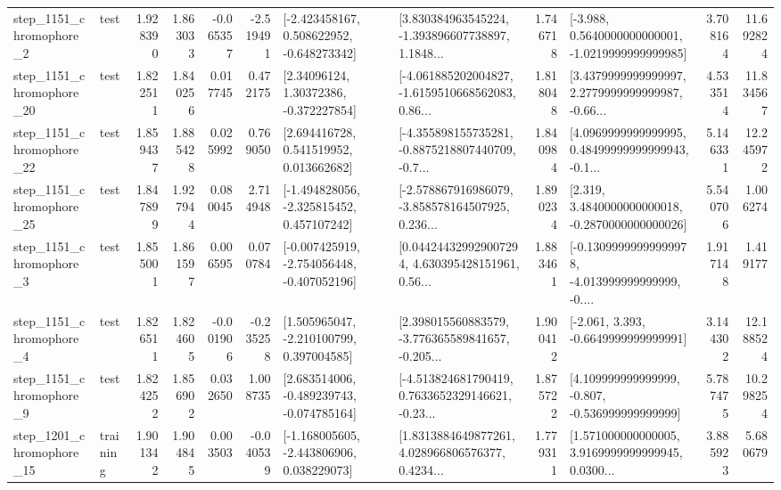 \begin{tabular}{llrrrrllrlrr}
  step\_1151\_chromophore\_2 &      test &      1.928390 &    1.863033 &     -0.065357 & -2.519491 &   [-2.423458167, 0.508622952, -0.648273342] &  [3.830384963545224, -1.393896607738897, 1.1848... &       1.746718 &  [-3.988, 0.5640000000000001, -1.0219999999999985] &            3.708164 &         11.692824 \\
 step\_1151\_chromophore\_20 &      test &      1.822511 &    1.840256 &      0.017745 &  0.472175 &      [2.34096124, 1.30372386, -0.372227854] &  [-4.061885202004827, -1.6159510668562083, 0.86... &       1.818048 &  [3.4379999999999997, 2.2779999999999987, -0.66... &            4.533514 &         11.834567 \\
 step\_1151\_chromophore\_22 &      test &      1.859437 &    1.885428 &      0.025992 &  0.769050 &     [2.694416728, 0.541519952, 0.013662682] &  [-4.355898155735281, -0.8875218807440709, -0.7... &       1.840984 &  [4.0969999999999995, 0.48499999999999943, -0.1... &            5.146331 &         12.245972 \\
 step\_1151\_chromophore\_25 &      test &      1.847899 &    1.927944 &      0.080045 &  2.714948 &   [-1.494828056, -2.325815452, 0.457107242] &  [-2.578867916986079, -3.858578164507925, 0.236... &       1.890234 &   [2.319, 3.4840000000000018, -0.2870000000000026] &            5.540706 &          1.006274 \\
  step\_1151\_chromophore\_3 &      test &      1.855001 &    1.861597 &      0.006595 &  0.070784 &  [-0.007425919, -2.754056448, -0.407052196] &  [0.044244329929007294, 4.630395428151961, 0.56... &       1.883461 &  [-0.13099999999999978, -4.013999999999999, -0.... &            1.917148 &          1.419177 \\
  step\_1151\_chromophore\_4 &      test &      1.826511 &    1.824605 &     -0.001906 & -0.235258 &    [1.505965047, -2.210100799, 0.397004585] &  [2.398015560883579, -3.776365589841657, -0.205... &       1.900412 &               [-2.061, 3.393, -0.6649999999999991] &            3.144302 &         12.188524 \\
  step\_1151\_chromophore\_9 &      test &      1.824252 &    1.856902 &      0.032650 &  1.008735 &   [2.683514006, -0.489239743, -0.074785164] &  [-4.513824681790419, 0.7633652329146621, -0.23... &       1.875722 &    [4.109999999999999, -0.807, -0.536999999999999] &            5.787475 &         10.298254 \\
 step\_1201\_chromophore\_15 &  training &      1.901342 &    1.904845 &      0.003503 & -0.040539 &   [-1.168005605, -2.443806906, 0.038229073] &  [1.8313884649877261, 4.028966806576377, 0.4234... &       1.779311 &  [1.571000000000005, 3.9169999999999945, 0.0300... &            3.885923 &          5.680679 \\

\end{tabular}
